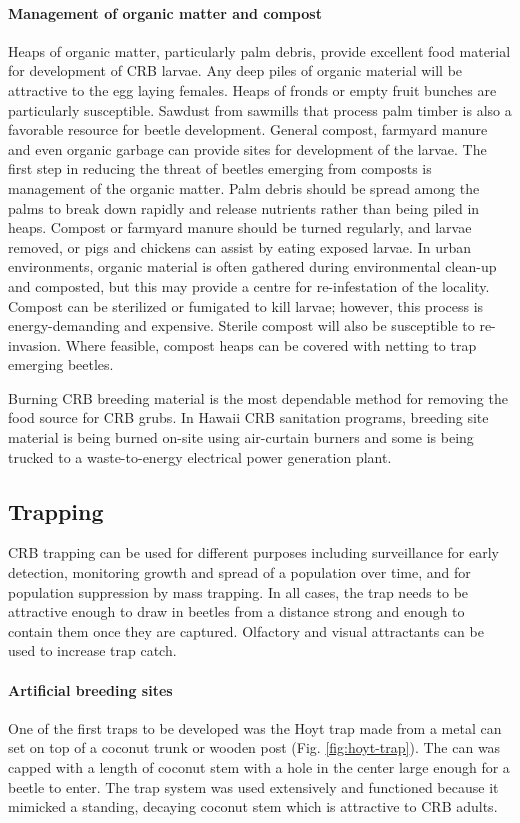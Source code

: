\documentclass[twocolumn,letterpaper]{scrartcl}
\begin{document}
\paragraph{Management of organic matter and compost}
Heaps  of  organic  matter,  particularly  palm  debris,  provide  excellent  food  material  for  development  of  CRB larvae. Any deep piles of organic material will be attractive to the egg laying females. Heaps of fronds or empty fruit bunches are particularly susceptible. Sawdust from sawmills that process palm timber is also a favorable resource for beetle development. General compost, farmyard manure and even organic garbage can provide sites for development of the larvae. The first step in reducing the threat of beetles emerging from composts is management of the organic matter. Palm debris should be spread among the palms to break down rapidly and release nutrients rather than being piled in heaps. Compost or farmyard manure should be turned regularly, and larvae removed, or pigs and chickens can assist by eating exposed larvae. In urban environments, organic material is often gathered during environmental clean-up and composted, but this may provide a centre for re-infestation of the locality. Compost can be sterilized or fumigated to kill larvae; however, this process is energy-demanding  and  expensive.  Sterile  compost  will  also  be  susceptible  to  re-invasion. Where  feasible,  compost heaps can be covered with netting to trap emerging beetles.

Burning CRB breeding material is the most dependable method for removing the food source for CRB grubs. In Hawaii CRB sanitation programs, breeding site material is being burned on-site using air-curtain burners and some is being trucked to a waste-to-energy electrical power generation plant. 

\subsection{Trapping}

CRB trapping can be used for different purposes including surveillance for early detection, monitoring growth and spread of a population over time, and for population suppression by mass trapping. In all cases, the trap needs to be attractive enough to draw in beetles from a distance strong and enough to contain them once they are captured. Olfactory and visual attractants can be used to increase trap catch. 

\paragraph{Artificial breeding sites} One of the first traps to be developed was the Hoyt trap made from a metal can set on top of a coconut trunk or wooden post (Fig. \ref{fig:hoyt-trap}). The can was capped with a length of coconut stem with a hole in the center large enough for a beetle to enter. The trap system was used extensively and functioned because it mimicked a standing, decaying coconut stem which is attractive to CRB adults. 
\end{document}
